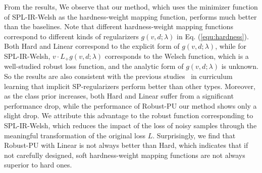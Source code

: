 \documentclass[sigconf]{acmart}
\newcommand{\ourmethod}{Robust-PU\xspace}
\begin{document}
From the results, We observe that our method, which uses the minimizer function of SPL-IR-Welsh as the hardness-weight mapping function, performs much better than the baselines. Note that different hardness-weight mapping functions correspond to different kinds of regularizers $g(v,d;\lambda)$ in Eq. (\ref{equ:hardness}). Both Hard and Linear correspond to the explicit form of $g(v,d;\lambda)$, while for SPL-IR-Welsh, $v\cdot L_+g(v,d;\lambda)$ corresponds to the Welsch function, which is a well-studied robust loss function, and the analytic form of $g(v,d;\lambda)$ is unknown. So the results are also consistent with the previous studies~\cite{wang2021survey} in curriculum learning that implicit SP-regularizers perform better than other types. Moreover, as the class prior increases, both Hard and Linear suffer from a significant performance drop, while the performance of \ourmethod our method shows only a slight drop. We attribute this advantage to the robust function corresponding to SPL-IR-Welsh, which reduces the impact of the loss of noisy samples through the meaningful transformation of the original loss $L$. Surprisingly, we find that \ourmethod with Linear is not always better than Hard, which indicates that if not carefully designed, soft hardness-weight mapping functions are not always superior to hard ones.
\end{document}
